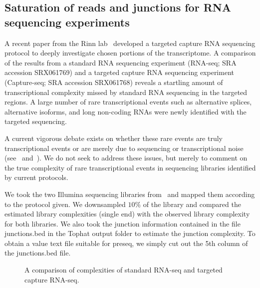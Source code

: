 \documentclass[11pt, titlepage]{article}
\begin{document}
\newpage


\subsection*{Saturation of reads and junctions for RNA sequencing experiments}

A recent paper from the Rinn lab~\cite{mercer2011targeted}
developed a targeted capture RNA sequencing
protocol to deeply investigate chosen portions of the transcriptome.  
A comparison of the results from a standard RNA sequencing
experiment (RNA-seq; SRA accession SRX061769) and a targeted capture RNA sequencing
experiment (Capture-seq; SRA accession SRX061768) reveals
a startling amount of transcriptional complexity missed by standard
RNA sequencing in the targeted regions.  A large number of
rare transcriptional events such as alternative splices, alternative isoforms,
and long non-coding RNAs were newly identified with the targeted sequencing.

A current vigorous debate exists on whether these rare events are truly transcriptional
events or are merely due to sequencing or transcriptional noise 
(see~\cite{van2010most} and~\cite{clark2011reality}).  We do not seek to address
these issues, but merely to comment on the true complexity
of rare transcriptional events in sequencing libraries identified by current
protocols.

We took the two Illumina sequencing libraries from~\cite{mercer2011targeted} and
mapped them according to the protocol given.  We downsampled $10 \%$ of the library
and compared the estimated library complexities (single end) with the observed library
complexity for both libraries.  We also took the junction information contained in the file
junctions.bed in the Tophat output folder to estimate the junction complexity.  To
obtain a value text file suitable for preseq, we simply cut out the 5th column of the 
junctions.bed file.  

\begin{figure}[h!]
\caption{A comparison of complexities of standard RNA-seq and 
targeted capture RNA-seq.}
\end{figure}
\end{document}
